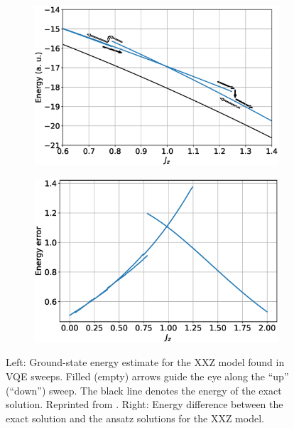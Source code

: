 \begin{figure}
    \centering
    \begin{subfigure}{.48\linewidth}
        \centering
        \includegraphics[width=\textwidth]{../figures/vqe_hysteresis_xxz_new.eps}
    \end{subfigure}\begin{subfigure}{.48\linewidth}
        \centering
        \includegraphics[width=\textwidth]{../figures/dE_xxz_best.eps}
    \end{subfigure}
    \caption{Left: Ground-state energy estimate for the XXZ model found
    in VQE sweeps. Filled (empty) arrows guide the eye along the
    “up” (“down”) sweep. The black line denotes the energy of the exact solution. Reprinted from \cite{uvarov_machine_2020}. Right: Energy difference between the exact solution and the ansatz solutions for the XXZ model.}
    \label{fig:dE_xxz}
\end{figure}

